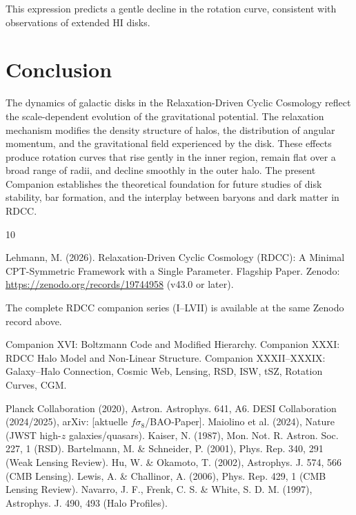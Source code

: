 \documentclass[11pt,a4paper]{article}
\begin{document}
This expression predicts a gentle decline in the rotation curve, consistent with 
observations of extended HI disks.
\section{Conclusion}

The dynamics of galactic disks in the Relaxation-Driven Cyclic Cosmology reflect 
the scale-dependent evolution of the gravitational potential. The relaxation 
mechanism modifies the density structure of halos, the distribution of angular 
momentum, and the gravitational field experienced by the disk. These effects 
produce rotation curves that rise gently in the inner region, remain flat over a 
broad range of radii, and decline smoothly in the outer halo. The present 
Companion establishes the theoretical foundation for future studies of disk 
stability, bar formation, and the interplay between baryons and dark matter in 
RDCC.


\begin{thebibliography}{10}

 Lehmann, M. (2026). Relaxation-Driven Cyclic Cosmology (RDCC): A Minimal CPT-Symmetric Framework with a Single Parameter. Flagship Paper. Zenodo: \url{https://zenodo.org/records/19744958} (v43.0 or later).

 The complete RDCC companion series (I--LVII) is available at the same Zenodo record above.

 Companion XVI: Boltzmann Code and Modified Hierarchy.
 Companion XXXI: RDCC Halo Model and Non-Linear Structure.
 Companion XXXII--XXXIX: Galaxy--Halo Connection, Cosmic Web, Lensing, RSD, ISW, tSZ, Rotation Curves, CGM.

 Planck Collaboration (2020), Astron. Astrophys. 641, A6.
 DESI Collaboration (2024/2025), arXiv: [aktuelle $f\sigma_8$/BAO-Paper].
 Maiolino et al. (2024), Nature (JWST high-$z$ galaxies/quasars).
 Kaiser, N. (1987), Mon. Not. R. Astron. Soc. 227, 1 (RSD).
 Bartelmann, M. \& Schneider, P. (2001), Phys. Rep. 340, 291 (Weak Lensing Review).
 Hu, W. \& Okamoto, T. (2002), Astrophys. J. 574, 566 (CMB Lensing).
 Lewis, A. \& Challinor, A. (2006), Phys. Rep. 429, 1 (CMB Lensing Review).
 Navarro, J. F., Frenk, C. S. \& White, S. D. M. (1997), Astrophys. J. 490, 493 (Halo Profiles).

\end{thebibliography}
\end{document}
